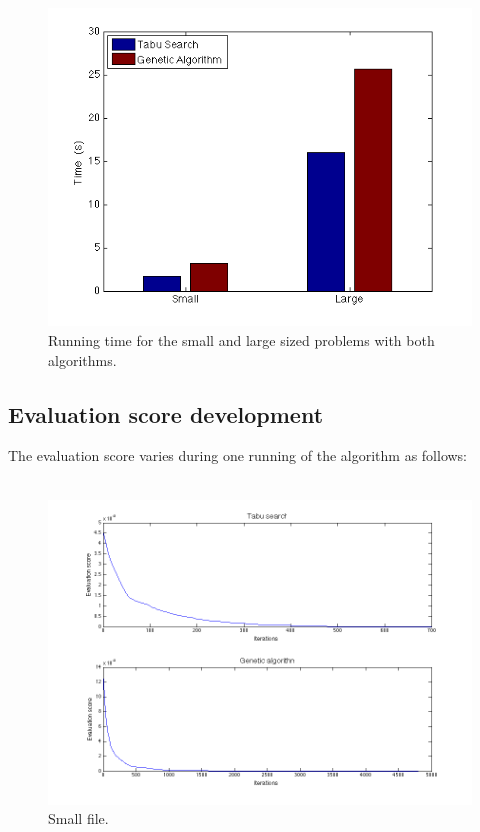 \documentclass[titlepage,a4paper]{article}
\begin{document}
\begin{figure}[H]
  \centering
    \includegraphics[scale=0.5]{../results/figures/time_bar_graph.png}
  \caption{Running time for the small and large sized problems with both algorithms.}
  \label{time_bar_graph}
\end{figure}

\pagebreak
\subsection{Evaluation score development}
The evaluation score varies during one running of the algorithm as follows: \\\\
\begin{figure}[H]
  \centerline{\includegraphics[scale=0.5]{../results/figures/plot_small.png}}
  \caption{Small file.}
  \label{plot_small}
\end{figure}
\end{document}
